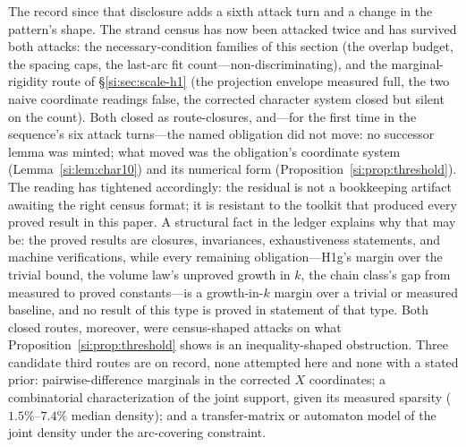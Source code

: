 The record since that disclosure adds a sixth attack turn and a change
in the pattern's shape. The strand census has now been attacked twice
and has survived both attacks: the necessary-condition families of
this section (the overlap budget, the spacing caps, the last-arc fit
count---non-discriminating), and the marginal-rigidity route of
\S\ref{si:sec:scale-h1} (the projection envelope measured full, the two
naive coordinate readings false, the corrected character system closed
but silent on the count). Both closed as route-closures, and---for the
first time in the sequence's six attack turns---the named obligation
did not move: no successor lemma was minted; what moved was the
obligation's coordinate system (Lemma~\ref{si:lem:char10}) and its
numerical form (Proposition~\ref{si:prop:threshold}). The reading
has tightened accordingly: the residual is not a bookkeeping artifact
awaiting the right census format; it is resistant to the toolkit that
produced every proved result in this paper. A structural fact in the
ledger explains why that may be: the proved results are closures,
invariances, exhaustiveness statements, and machine verifications,
while every remaining obligation---H1g's margin over the trivial
bound, the volume law's unproved growth in $k$, the chain class's gap
from measured to proved constants---is a growth-in-$k$ margin over a
trivial or measured baseline, and no result of this type is proved in
statement of that type. Both closed routes, moreover, were
census-shaped attacks on what Proposition~\ref{si:prop:threshold} shows
is an inequality-shaped obstruction. Three candidate third routes are
on record, none attempted here and none with a stated prior:
pairwise-difference marginals in the corrected $X$ coordinates; a
combinatorial characterization of the joint support, given its
measured sparsity ($1.5\%$--$7.4\%$ median density); and a
transfer-matrix or automaton model of the joint density under the
arc-covering constraint.

